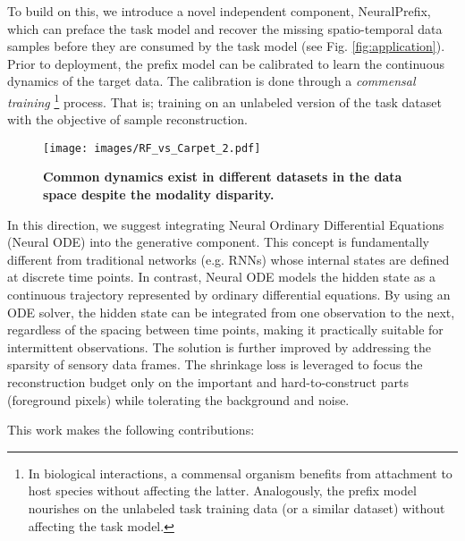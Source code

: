 \documentclass[10pt, conference, compsocconf]{IEEEtran}
\def\update#1{#1}
\begin{document}
To build on this, we introduce a novel independent component, NeuralPrefix, which can preface the task model and recover the missing \update{spatio-temporal} data samples before they are consumed by the task model (see Fig. \ref{fig:application}).  Prior to deployment, the prefix model can be calibrated to learn the continuous dynamics of the target data. The calibration is done through a \textit{commensal training} \footnote{In biological interactions, a commensal organism benefits from attachment to host species without affecting the latter. Analogously, the prefix model nourishes on the unlabeled task training data (or a similar dataset) without affecting the task model. }
process. That is; training on an unlabeled version of the task dataset with the objective of sample reconstruction.

\begin{figure}[t!]
    \centering
    \texttt{[image: images/RF\_vs\_Carpet\_2.pdf]}
    \caption{\textbf{Common dynamics exist in different datasets in the data space despite the modality disparity.}}
    \label{fig:common_dynamics}
\end{figure}

In this direction, we suggest integrating Neural Ordinary Differential Equations (Neural ODE) \cite{chen2018neural} into the generative component. This concept is fundamentally different from traditional networks (e.g. RNNs) whose internal states are defined at discrete time points. In contrast, Neural ODE models the hidden state as a continuous trajectory represented by ordinary differential equations. 
By using an ODE solver, the hidden state can be integrated from one observation to the next, regardless of the spacing between time points, making it practically suitable for intermittent observations. The solution is further improved by addressing the sparsity of sensory data frames. The shrinkage loss \cite{lu2020deep} is leveraged to focus the reconstruction budget only on the important and hard-to-construct parts (foreground pixels) while tolerating the background and noise.




This work makes the following contributions:
\end{document}
